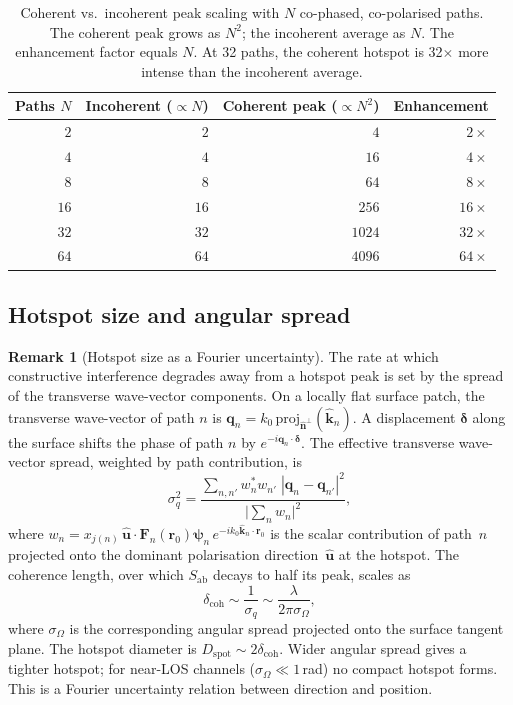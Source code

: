 \documentclass[11pt,a4paper]{article}
\theoremstyle{definition}      %
\newtheorem{remark}[remark]{Remark}
\newcommand{\rr}{\mathbf{r}}
\newcommand{\Sab}{S_{\mathrm{ab}}}
\begin{document}
\begin{table}[!htbp]
\centering
\caption{Coherent vs.\ incoherent peak scaling with $N$ co-phased,
  co-polarised paths.  The coherent peak grows as $N^2$; the
  incoherent average as $N$.  The enhancement factor equals $N$.
  At 32 paths, the coherent hotspot is 32$\times$ more intense than
  the incoherent average.}\label{tab:coherent-scaling}
\begin{tabular}{rrrr}
\toprule
Paths $N$ & Incoherent ($\propto N$) & Coherent peak ($\propto N^2$)
  & Enhancement \\
\midrule
$2$  & $2$  & $4$     & $2\times$  \\
$4$  & $4$  & $16$    & $4\times$  \\
$8$  & $8$  & $64$    & $8\times$  \\
$16$ & $16$ & $256$   & $16\times$ \\
$32$ & $32$ & $1024$  & $32\times$ \\
$64$ & $64$ & $4096$  & $64\times$ \\
\bottomrule
\end{tabular}
\end{table}

\subsection{Hotspot size and angular spread}\label{sec:hotspot-size}

\begin{remark}[Hotspot size as a Fourier uncertainty]
The rate at which constructive interference degrades away from a
hotspot peak is set by the spread of the transverse wave-vector
components.  On a locally flat surface patch, the transverse
wave-vector of path $n$ is
$\mathbf{q}_n = k_0\,\mathrm{proj}_{\hat{\mathbf{n}}^\perp}(\hat{\mathbf{k}}_n)$.
A displacement $\boldsymbol{\delta}$ along the surface shifts the
phase of path $n$ by $e^{-i\mathbf{q}_n\cdot\boldsymbol{\delta}}$.
The effective transverse wave-vector spread, weighted by path
contribution, is
\begin{equation}
  \sigma_q^2 = \frac{\sum_{n,n'} w_n^* w_{n'}\;
  |\mathbf{q}_n - \mathbf{q}_{n'}|^2}
  {\bigl|\sum_n w_n\bigr|^2},
\end{equation}
where $w_n = x_{j(n)}\,\hat{\mathbf{u}}\cdot
\mathbf{F}_n(\rr_0)\boldsymbol{\psi}_n\,
e^{-ik_0\hat{\mathbf{k}}_n\cdot\rr_0}$ is the scalar contribution
of path~$n$ projected onto the dominant polarisation
direction~$\hat{\mathbf{u}}$ at the hotspot.
The coherence length, over which $\Sab$ decays to half its peak,
scales as
\begin{equation}
  \delta_\mathrm{coh} \sim \frac{1}{\sigma_q} \sim \frac{\lambda}{2\pi\sigma_\Omega},
\end{equation}
where $\sigma_\Omega$ is the
corresponding angular spread projected onto the surface tangent
plane.  The hotspot diameter is $D_\mathrm{spot} \sim 2\delta_\mathrm{coh}$.
Wider angular spread gives a tighter hotspot; for near-LOS channels
($\sigma_\Omega \ll 1$\,rad) no compact hotspot forms.  This is a
Fourier uncertainty relation between direction and position.
\end{remark}
\end{document}
